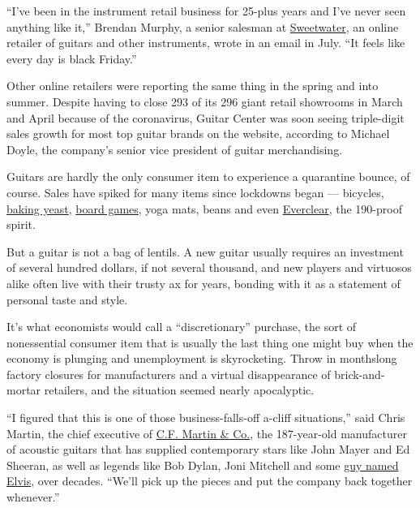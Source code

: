 ``I've been in the instrument retail business for 25-plus years and I've
never seen anything like it,'' Brendan Murphy, a senior salesman at
\href{https://www.sweetwater.com/}{Sweetwater}, an online retailer of
guitars and other instruments, wrote in an email in July. ``It feels
like every day is black Friday.''

Other online retailers were reporting the same thing in the spring and
into summer. Despite having to close 293 of its 296 giant retail
showrooms in March and April because of the coronavirus, Guitar Center
was soon seeing triple-digit sales growth for most top guitar brands on
the website, according to Michael Doyle, the company's senior vice
president of guitar merchandising.

Guitars are hardly the only consumer item to experience a quarantine
bounce, of course. Sales have spiked for many items since lockdowns
began --- bicycles,
\href{https://www.businessinsider.com/coronavirus-sales-increases-unlikely-items-selling-well-high-demand-2020-4\#hair-dye-2}{baking
yeast},
\href{https://www.cnbc.com/2020/03/23/what-people-are-buying-during-the-coronavirus-outbreak-and-why.html}{board
games}, yoga mats, beans and even
\href{https://www.nytimes3xbfgragh.onion/2020/07/09/style/how-everclear-became-a-pandemic-favorite.html}{Everclear},
the 190-proof spirit.

But a guitar is not a bag of lentils. A new guitar usually requires an
investment of several hundred dollars, if not several thousand, and new
players and virtuosos alike often live with their trusty ax for years,
bonding with it as a statement of personal taste and style.

It's what economists would call a ``discretionary'' purchase, the sort
of nonessential consumer item that is usually the last thing one might
buy when the economy is plunging and unemployment is skyrocketing. Throw
in monthslong factory closures for manufacturers and a virtual
disappearance of brick-and-mortar retailers, and the situation seemed
nearly apocalyptic.

``I figured that this is one of those business-falls-off a-cliff
situations,'' said Chris Martin, the chief executive of
\href{https://www.martinguitar.com/}{C.F. Martin \& Co.}, the
187-year-old manufacturer of acoustic guitars that has supplied
contemporary stars like John Mayer and Ed Sheeran, as well as legends
like Bob Dylan, Joni Mitchell and some
\href{https://www.martinguitar.com/standard-series-reimagined/}{guy
named Elvis}, over decades. ``We'll pick up the pieces and put the
company back together whenever.''

